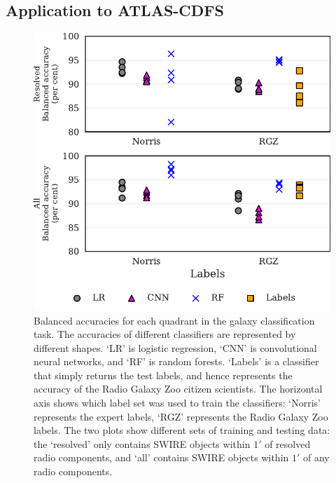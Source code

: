 \documentclass[fleqn,usenatbib,usedcolumn]{mnras}
\begin{document}
  \subsection{Application to ATLAS-CDFS}

    \begin{figure}
    \centering
    \includegraphics[width=\columnwidth]{images/cdfs_ba_grid.pdf}
    \caption{Balanced accuracies for each quadrant in the galaxy
      classification task. The accuracies of different classifiers are
      represented by different shapes. `LR' is logistic regression, `CNN' is
      convolutional neural networks, and `RF' is random forests. `Labels' is a
      classifier that simply returns the test labels, and hence represents the
      accuracy of the Radio Galaxy Zoo citizen scientists. The horizontal axis
      shows which label set was used to train the classifiers: `Norris'
      represents the expert labels, `RGZ' represents the Radio Galaxy Zoo
      labels. The two plots show different sets of training and testing data:
      the `resolved' only contains SWIRE objects within $1'$ of resolved radio
      components, and `all' contains SWIRE objects within $1'$ of any radio
      components.
      \label{fig:ba}}
    \end{figure}
\end{document}
